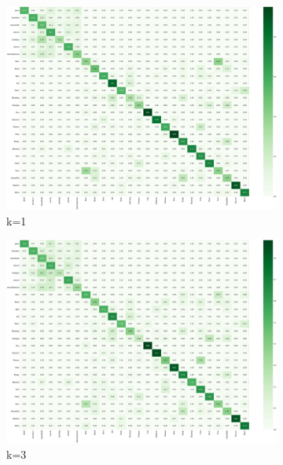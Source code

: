 \begin{figure}
    \centering
    \begin{subfigure}[b]{0.49\textwidth}
        \includegraphics[width=\textwidth]{assets/evaluation_results/KNN/confusion_matrix_k_1.png}
        \caption{k=1}
    \end{subfigure}
    \hfill
    \begin{subfigure}[b]{0.49\textwidth}
        \includegraphics[width=\textwidth]{assets/evaluation_results/KNN/confusion_matrix_k_3.png}
        \caption{k=3}
    \end{subfigure}
    \hfill
    \begin{subfigure}[b]{0.49\textwidth}

\end{subfigure}
\end{figure}
